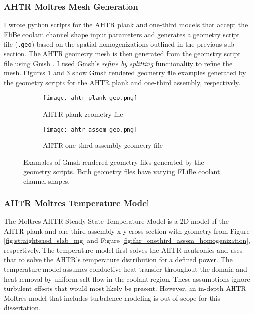 \subsubsection{AHTR Moltres Mesh Generation}
I wrote python scripts for the \gls{AHTR} plank and one-third models that accept the 
FliBe coolant channel shape input parameters and generates a geometry script file 
(\texttt{.geo}) based on the spatial homogenizations outlined in the previous 
sub-section.
The AHTR geometry mesh is then generated from the geometry script file using 
Gmsh \cite{geuzaine_gmsh_2009}.
I used Gmsh's \textit{refine by splitting} functionality to refine the mesh. 
Figures \ref{fig:ahtr-plank-geo} and \ref{fig:ahtr-assem-geo} show Gmsh rendered 
geometry file examples generated by the geometry scripts for the AHTR plank 
and one-third assembly, respectively. 
\begin{figure}[htbp]
    \centering
    \begin{subfigure}{0.7\textwidth}
        \texttt{[image: ahtr-plank-geo.png]}
        \caption{AHTR plank geometry file}
        \label{fig:ahtr-plank-geo} 
    \end{subfigure}
    \begin{subfigure}{0.7\textwidth}
        \texttt{[image: ahtr-assem-geo.png]}
        \caption{AHTR one-third assembly geometry file}
        \label{fig:ahtr-assem-geo} 
    \end{subfigure}
    \caption{Examples of Gmsh rendered geometry files generated by the geometry scripts.
    Both geometry files have varying FLiBe coolant channel shapes.}
\end{figure}

\subsubsection{AHTR Moltres Temperature Model}
\label{sec:ahtr-moltres-temperature-model}
The Moltres \gls{AHTR} Steady-State Temperature Model is a 2D model of the 
\gls{AHTR} plank and one-third assembly x-y cross-section with geometry from 
Figure \ref{fig:straightened_slab_mg} and Figure 
\ref{fig:fhr_onethird_assem_homogenization}, respectively.  
The temperature model first solves the \gls{AHTR} neutronics and uses that to solve 
the \gls{AHTR}'s temperature distribution for a defined power.
The temperature model assumes conductive heat transfer throughout the domain 
and heat removal by uniform salt flow in the coolant region. 
These assumptions ignore turbulent effects that would most likely be present. 
However, an in-depth AHTR Moltres model that includes turbulence modeling is 
out of scope for this dissertation. 

